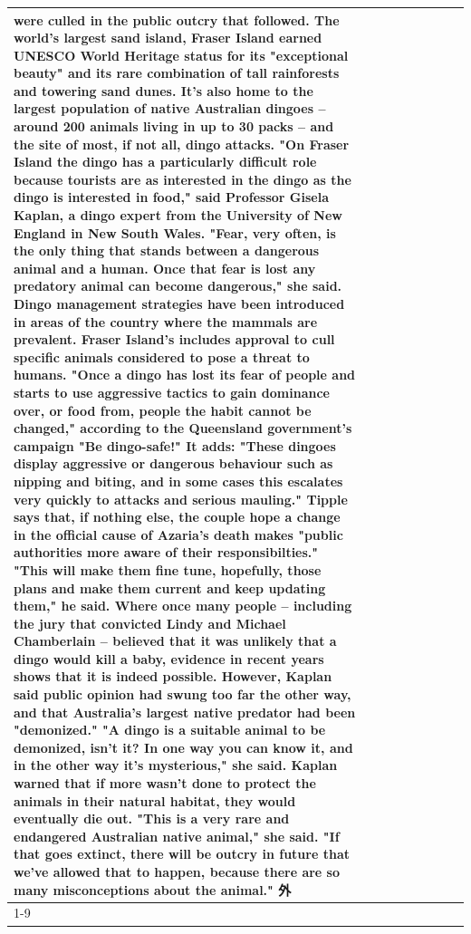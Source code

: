 \begin{table}[H]
\begin{tabular}{lllrlllll}
were culled in the public outcry that followed. The world's largest sand island, Fraser Island earned UNESCO World Heritage status for its "exceptional beauty" and its rare combination of tall rainforests and towering sand dunes. It's also home to the largest population of native Australian dingoes -- around 200 animals living in up to 30 packs -- and the site of most, if not all, dingo attacks. "On Fraser Island the dingo has a particularly difficult role because tourists are as interested in the dingo as the dingo is interested in food," said Professor Gisela Kaplan, a dingo expert from the University of New England in New South Wales. "Fear, very often, is the only thing that stands between a dangerous animal and a human. Once that fear is lost any predatory animal can become dangerous," she said. Dingo management strategies have been introduced in areas of the country where the mammals are prevalent. Fraser Island's includes approval to cull specific animals considered to pose a threat to humans. "Once a dingo has lost its fear of people and starts to use aggressive tactics to gain dominance over, or food from, people the habit cannot be changed," according to the Queensland government's campaign "Be dingo-safe!" It adds: "These dingoes display aggressive or dangerous behaviour such as nipping and biting, and in some cases this escalates very quickly to attacks and serious mauling." Tipple says that, if nothing else, the couple hope a change in the official cause of Azaria's death makes "public authorities more aware of their responsibilties." "This will make them fine tune, hopefully, those plans and make them current and keep updating them," he said. Where once many people -- including the jury that convicted Lindy and Michael Chamberlain -- believed that it was unlikely that a dingo would kill a baby, evidence in recent years shows that it is indeed possible. However, Kaplan said public opinion had swung too far the other way, and that Australia's largest native predator had been "demonized." "A dingo is a suitable animal to be demonized, isn't it? In one way you can know it, and in the other way it's mysterious," she said. Kaplan warned that if more wasn't done to protect the animals in their natural habitat, they would eventually die out. "This is a very rare and endangered Australian native animal," she said. "If that goes extinct, there will be outcry in future that we've allowed that to happen, because there are so many misconceptions about the animal." 外 \\
\cline{1-9}

\end{tabular}
\end{table}
